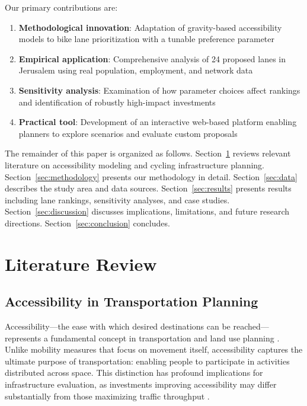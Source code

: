 \documentclass[12pt,a4paper]{article}
\begin{document}
Our primary contributions are:

\begin{enumerate}
    \item \textbf{Methodological innovation}: Adaptation of gravity-based accessibility models to bike lane prioritization with a tunable preference parameter
    \item \textbf{Empirical application}: Comprehensive analysis of 24 proposed lanes in Jerusalem using real population, employment, and network data
    \item \textbf{Sensitivity analysis}: Examination of how parameter choices affect rankings and identification of robustly high-impact investments
    \item \textbf{Practical tool}: Development of an interactive web-based platform enabling planners to explore scenarios and evaluate custom proposals
\end{enumerate}

The remainder of this paper is organized as follows. Section~\ref{sec:literature} reviews relevant literature on accessibility modeling and cycling infrastructure planning. Section~\ref{sec:methodology} presents our methodology in detail. Section~\ref{sec:data} describes the study area and data sources. Section~\ref{sec:results} presents results including lane rankings, sensitivity analyses, and case studies. Section~\ref{sec:discussion} discusses implications, limitations, and future research directions. Section~\ref{sec:conclusion} concludes.

\section{Literature Review}
\label{sec:literature}

\subsection{Accessibility in Transportation Planning}

Accessibility---the ease with which desired destinations can be reached---represents a fundamental concept in transportation and land use planning \citep{hansen1959accessibility}. Unlike mobility measures that focus on movement itself, accessibility captures the ultimate purpose of transportation: enabling people to participate in activities distributed across space. This distinction has profound implications for infrastructure evaluation, as investments improving accessibility may differ substantially from those maximizing traffic throughput \citep{levine2012accessibility}.
\end{document}
